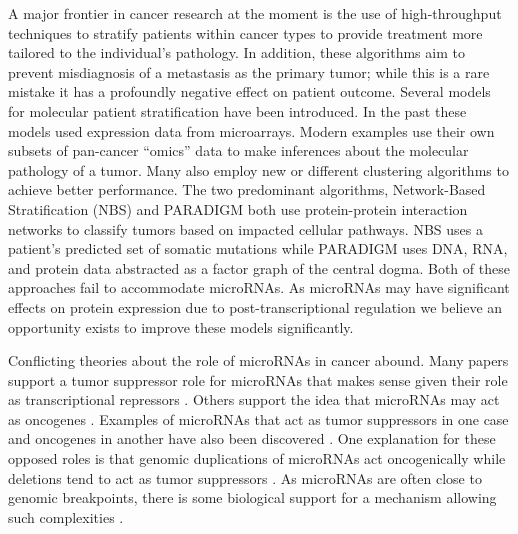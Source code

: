 \documentclass[12pt]{report}
\begin{document}
A major frontier in cancer research at the moment is the use of high-throughput
techniques to stratify patients within cancer types to provide treatment more 
tailored to the individual's pathology. In addition, these algorithms aim
to prevent misdiagnosis of a metastasis as the primary tumor; while this is a rare mistake
it has a profoundly negative effect on patient outcome. Several models for molecular patient stratification
have been introduced. In the past these models used expression data from
microarrays. Modern examples use their own subsets of pan-cancer ``omics'' data to make inferences about 
the molecular pathology of a tumor. Many also employ new or different clustering 
algorithms to achieve better performance. The two predominant algorithms, 
Network-Based Stratification (NBS) \cite{Hofree2013} and PARADIGM \cite{Vaske2010}
both use protein-protein interaction networks to classify tumors based on 
impacted cellular pathways. NBS uses a patient's predicted set of somatic
mutations while PARADIGM uses DNA, RNA, 
and protein data abstracted as a factor graph of the central dogma. Both of 
these approaches fail to accommodate microRNAs. As microRNAs may have 
significant effects on protein expression due to post-transcriptional regulation 
we believe an opportunity exists to improve these models significantly.


Conflicting theories about the role of microRNAs in cancer abound. Many papers 
support a tumor suppressor role for microRNAs that makes sense given their role 
as transcriptional repressors \cite{Bushati2007}. Others support the idea that microRNAs may act 
as oncogenes \cite{Gartel2008, Hammond2006}. Examples of microRNAs that act as tumor suppressors in one case 
and oncogenes in another have also been discovered \cite{Saraiya2013, Zhang2007}.
One explanation for these opposed roles is that genomic 
duplications of microRNAs act oncogenically while deletions tend to act as tumor 
suppressors \cite{Zhang2007}. As microRNAs are often close to genomic breakpoints, there is 
some biological support for a mechanism allowing such complexities \cite{Huppi2008}.
\end{document}
